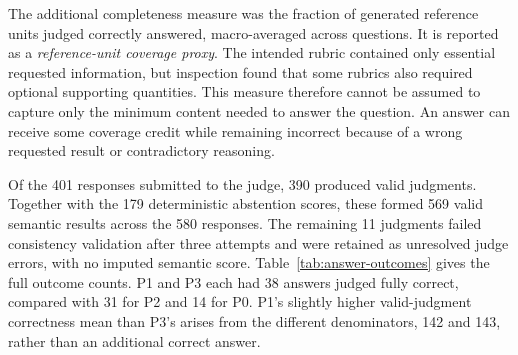 The additional completeness measure was the fraction of generated reference
units judged correctly answered, macro-averaged across questions. It is reported
as a \emph{reference-unit coverage proxy}. The intended rubric contained only
essential requested information, but inspection found that some rubrics also
required optional supporting quantities. This measure therefore cannot be
assumed to capture only the minimum content needed to answer the question.
An answer can receive some coverage credit while remaining incorrect because
of a wrong requested result or contradictory reasoning.

\begin{table}[H]
\centering
\caption{Post-hoc model-judged whole-answer correctness and reference-unit
coverage against the question, reference answer and annotated gold evidence,
with BERTScore similarity to the reference answer. Correctness and coverage
are means over the valid semantic judgments shown in $n$; exact abstentions
are valid zero scores. Judge errors have missing semantic scores. BERTScore
F1 uses all 145 answers per configuration, including abstentions.}
\label{tab:main-semantic-results}
\end{table}

Of the 401 responses submitted to the judge, 390 produced valid judgments.
Together with the 179 deterministic abstention scores, these formed 569 valid
semantic results across the 580 responses. The remaining 11 judgments failed
consistency validation after three attempts and were retained as unresolved
judge errors, with no imputed semantic score.
Table~\ref{tab:answer-outcomes} gives the full outcome counts. P1 and P3 each
had 38 answers judged fully correct, compared with 31 for P2 and 14 for P0.
P1's slightly higher valid-judgment correctness mean than P3's arises from the
different denominators, 142 and 143, rather than an additional correct answer.

